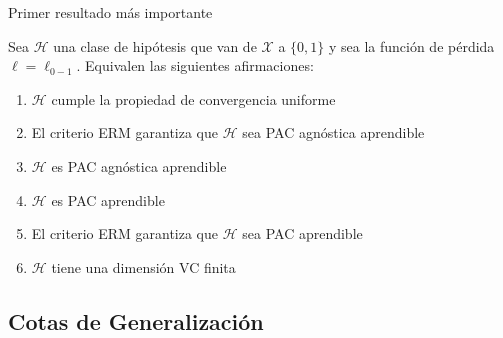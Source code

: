 \begin{frame}{Primer resultado más importante}
    
    \begin{theorem}
        Sea $\mathcal{H}$ una clase de hipótesis que van de $\mathcal{X}$ a $\{0,1\}$ y sea la función de pérdida $\ell = \ell_{0-1}$. Equivalen las siguientes afirmaciones:
        \begin{enumerate}
                \item $\mathcal{H}$ cumple la propiedad de convergencia uniforme
                \item El criterio ERM garantiza que $\mathcal{H}$ sea PAC agnóstica aprendible
                \item $\mathcal{H}$ es PAC agnóstica aprendible
                \item $\mathcal{H}$ es PAC aprendible
                \item El criterio ERM garantiza que $\mathcal{H}$ sea PAC aprendible
                \item $\mathcal{H}$ tiene una dimensión VC finita
            \end{enumerate}
    \end{theorem}
\end{frame}



\subsection{Cotas de Generalización}

